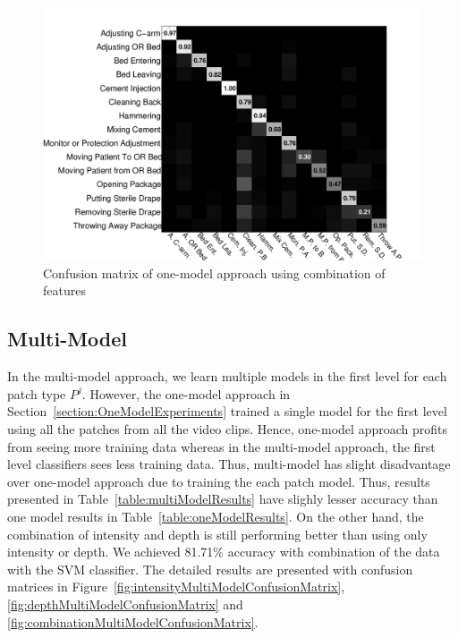 \begin{figure}[H]%
\begin{center}
\includegraphics[scale=0.4]{Figures/combination-onemodel}
\end{center}
\caption{Confusion matrix of one-model approach using combination of features
\label{fig:combinationOneModelConfusionMatrix}}
\end{figure}

\subsection{Multi-Model}
\label{section:MultiModelExperiments}
In the multi-model approach, we learn multiple models in the first level for each patch type $P^{j}$. However, the one-model approach in Section~\ref{section:OneModelExperiments} trained a single model for the first level using all the patches from all the video clips.
Hence, one-model approach profits from seeing more training data whereas in the multi-model approach, the first level classifiers sees less training data. Thus, multi-model has slight disadvantage over one-model approach due to training the each patch model. Thus, results presented in Table~\ref{table:multiModelResults} have slighly lesser accuracy than one model results in Table~\ref{table:oneModelResults}. On the other hand, the combination of intensity and depth is still performing better than using only intensity or depth. We achieved 81.71\% accuracy with combination of the data with the SVM classifier. The detailed results are presented with confusion matrices in Figure~\ref{fig:intensityMultiModelConfusionMatrix}, \ref{fig:depthMultiModelConfusionMatrix} and \ref{fig:combinationMultiModelConfusionMatrix}.
            
